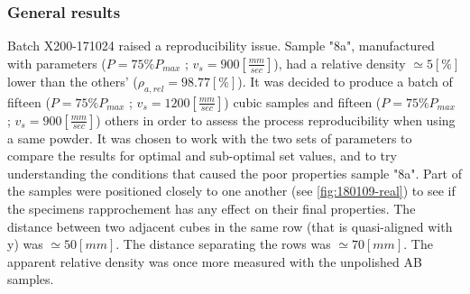 \subsubsection{General results}
Batch X200-171024 raised a reproducibility issue. Sample "8a", manufactured with parameters ($P=75\% P_{max}$ ; $v_s=900 [\frac{mm}{sec}]$), had a relative density $\simeq 5 [\%]$ lower than the others' ($\rho_{a,rel}=98.77[\%]$). It was decided to produce a batch of fifteen ($P=75\% P_{max}$ ; $v_s=1200 [\frac{mm}{sec}]$) cubic samples and fifteen ($P=75\% P_{max}$ ; $v_s=900 [\frac{mm}{sec}]$) others in order to assess the process reproducibility when using a same powder. It was chosen to work with the two sets of parameters to compare the results for optimal and sub-optimal set values, and to try understanding the conditions that caused the poor properties sample "8a". Part of the samples were positioned closely to one another (see \ref{fig:180109-real}) to see if the specimens rapprochement has any effect on their final properties. The distance between two adjacent cubes in the same row (that is quasi-aligned with y) was $\simeq 50 [mm]$. The distance separating the rows was $\simeq 70 [mm]$. The apparent relative density was once more measured with the unpolished AB samples.\\

 \begin{center}
\begin{table}[ht]
\noindent{}

\caption[Average values and standard deviations for apparent relative densities and hardnesses of the specimens of batch X200-171024]{Average values and standard deviations for apparent relative densities and hardnesses of the specimens of batch X200-171024}
\label{tab:78}
\end{table}
 \end{center}

